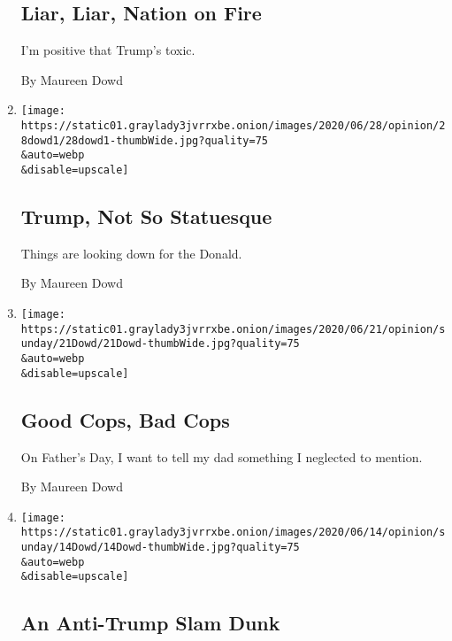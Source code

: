 \begin{enumerate}
  \hypertarget{liar-liar-nation-on-fire}{%
  \subsection{Liar, Liar, Nation on
  Fire}\label{liar-liar-nation-on-fire}}

  I'm positive that Trump's toxic.

  By Maureen Dowd
\item
  \href{/2020/06/27/opinion/sunday/trump-statues-2020-reelection.html}{}

  \texttt{[image: https://static01.graylady3jvrrxbe.onion/images/2020/06/28/opinion/28dowd1/28dowd1-thumbWide.jpg?quality=75\\\&auto=webp\\\&disable=upscale]}

  \hypertarget{trump-not-so-statuesque}{%
  \subsection{Trump, Not So Statuesque}\label{trump-not-so-statuesque}}

  Things are looking down for the Donald.

  By Maureen Dowd
\item
  \href{/2020/06/20/opinion/sunday/police-good-cops-fathers-day.html}{}

  \texttt{[image: https://static01.graylady3jvrrxbe.onion/images/2020/06/21/opinion/sunday/21Dowd/21Dowd-thumbWide.jpg?quality=75\\\&auto=webp\\\&disable=upscale]}

  \hypertarget{good-cops-bad-cops}{%
  \subsection{Good Cops, Bad Cops}\label{good-cops-bad-cops}}

  On Father's Day, I want to tell my dad something I neglected to
  mention.

  By Maureen Dowd
\item
  \href{/2020/06/13/opinion/sunday/gregg-popovich-trump-nba-protests.html}{}

  \texttt{[image: https://static01.graylady3jvrrxbe.onion/images/2020/06/14/opinion/sunday/14Dowd/14Dowd-thumbWide.jpg?quality=75\\\&auto=webp\\\&disable=upscale]}

  \hypertarget{an-anti-trump-slam-dunk}{%
  \subsection{An Anti-Trump Slam Dunk}\label{an-anti-trump-slam-dunk}}


\end{enumerate}
